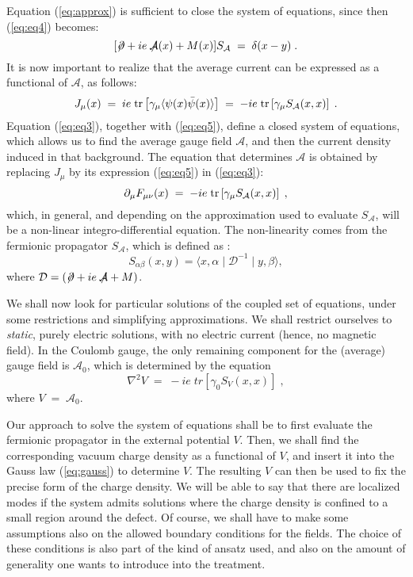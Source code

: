 \documentclass[a4paper,12pt]{article}
\begin{document}
{{Equation (\ref{eq:approx}) is sufficient to close the system of
equations, since then (\ref{eq:eq4}) becomes:
\begin{equation}
   \label{eq:eq4ap}
[\not\! \partial + i e \not\!\!{\mathcal A}(x) + M(x)] S_{{\mathcal A}}\;=\; \delta (x-y) \;.
\end{equation}
It is now important to realize that the average current can be
expressed as a functional of ${\mathcal A}$, as follows:
\begin{equation}
   \label{eq:eq5}
J_\mu (x) \;=\;i e\; {\rm tr}\left[\gamma_\mu \langle \psi(x){\bar\psi}(x)\rangle \right] \;=\;
- i e\; {\rm tr} \left[\gamma_\mu S_{\mathcal A}(x,x) \right] \;.
\end{equation}
Equation (\ref{eq:eq3}), together with (\ref{eq:eq5}), define a closed
system of equations, which allows us to find the average gauge field
${\mathcal A}$, and then the current density induced in that
background.  The equation that determines ${\mathcal A}$ is obtained
by replacing $J_\mu$ by its expression (\ref{eq:eq5}) in
(\ref{eq:eq3}):
\begin{equation}
   \label{eq:eqa}
\partial_\mu F_{\mu\nu}(x)\;=\;-i e\; {\rm tr} \left[\gamma_\mu S_{\mathcal A}(x,x)\right] \;,
\end{equation}
which, in general, and depending on the approximation used to evaluate
$S_{\mathcal A}$, will be a non-linear integro-differential equation.
The non-linearity comes from the fermionic propagator $S_{\mathcal
  A}$, which is defined as :
\begin{equation}
S_{\alpha\beta}(x,y)=\langle x,\alpha \mid {\mathcal D}^{-1} \mid y, \beta \rangle ,
\end{equation}
where ${\mathcal D}=(\not \! \partial + i e \not\!\! {\mathcal A} + M
)$.


We shall now look for particular solutions of the coupled set of
equations, under some restrictions and simplifying approximations.  We
shall restrict ourselves to {\em static\/}, purely electric solutions,
with no electric current (hence, no magnetic field). In the Coulomb
gauge, the only remaining component for the (average) gauge field is
${\mathcal A}_0$, which is determined by the equation
\begin{equation}
   \label{eq:gauss}
\nabla^2 V \;=\; - i e\; tr[\gamma_0 S_V(x,x)] \;,
\end{equation}
where $V\;=\;{\mathcal A}_0$.

Our approach to solve the system of equations shall be to first
evaluate the fermionic propagator in the external potential $V$. Then,
we shall find the corresponding vacuum charge density as a functional
of $V$, and insert it into the Gauss law (\ref{eq:gauss}) to determine
$V$. The resulting $V$ can then be used to fix the precise form of the
charge density. We will be able to say that there are localized modes
if the system admits solutions where the charge density is confined to
a small region around the defect. Of course, we shall have to make
some assumptions also on the allowed boundary conditions for the
fields. The choice of these conditions is also part of the kind of
ansatz used, and also on the amount of generality one wants to
introduce into the treatment.

}}
\end{document}
